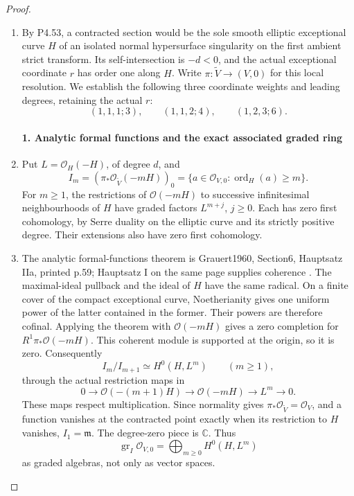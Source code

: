 \begin{proof}

\begin{enumerate}[label={$\langle1\rangle$\arabic*.},leftmargin=*]
\item By P4.53, a contracted section would be the sole smooth
elliptic exceptional curve $H$ of an isolated normal
hypersurface singularity on the first ambient strict
transform. Its self-intersection is $-d<0$, and the
actual exceptional coordinate $r$ has order one along
$H$. Write $\pi:\widetilde V\to(V,0)$ for this local
resolution. We establish the following three coordinate
weights and leading degrees, retaining the actual $r$:
\[
 (1,1,1;3),\qquad(1,1,2;4),\qquad(1,2,3;6).
                                                        \tag{4.54w.1}
\]

\paragraph{1. Analytic formal functions and the exact associated graded ring}

\item Put \(L=\mathcal O_H(-H)\), of degree \(d\), and
\[
 I_m=(\pi_*\mathcal O_{\widetilde V}(-mH))_0
     =\{a\in\mathcal O_{V,0}:\operatorname{ord}_H(a)\ge m\}.
\]
For \(m\ge1\), the restrictions of
\(\mathcal O(-mH)\) to successive infinitesimal neighbourhoods
of \(H\) have graded factors \(L^{m+j}\), \(j\ge0\).
Each has zero first cohomology, by Serre duality on the elliptic
curve and its strictly positive degree. Their extensions also
have zero first cohomology.

\item The analytic formal-functions theorem is Grauert1960,
Section6, Hauptsatz IIa, printed p.59; Hauptsatz I on the same
page supplies coherence \cite[\S6, Hauptsätze I and IIa]{Grauert60}. The maximal-ideal pullback and the
ideal of \(H\) have the same radical. On a finite cover of
the compact exceptional curve, Noetherianity gives one uniform
power of the latter contained in the former. Their powers are
therefore cofinal. Applying the theorem with
\(\mathcal O(-mH)\) gives a zero completion for
\(R^1\pi_*\mathcal O(-mH)\). This coherent module is
supported at the origin, so it is zero. Consequently
\[
 I_m/I_{m+1}\simeq H^0(H,L^m)\qquad(m\ge1),             \tag{4.54w.2}
\]
through the actual restriction maps in
\[
 0\longrightarrow\mathcal O(-(m+1)H)
 \longrightarrow\mathcal O(-mH)
 \longrightarrow L^m\longrightarrow0.
\]
These maps respect multiplication. Since normality gives
\(\pi_*\mathcal O_{\widetilde V}=\mathcal O_V\), and a
function vanishes at the contracted point exactly when its
restriction to \(H\) vanishes, \(I_1=\mathfrak m\).
The degree-zero piece is \(\mathbb C\). Thus
\[
 \operatorname{gr}_{I}\mathcal O_{V,0}
   =\bigoplus_{m\ge0}H^0(H,L^m)                         \tag{4.54w.3}
\]
as graded algebras, not only as vector spaces.


\end{enumerate}
\end{proof}
